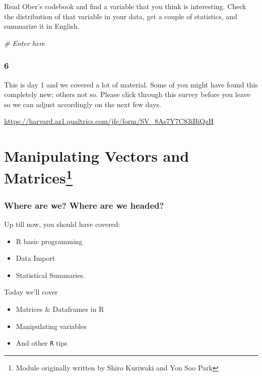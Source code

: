 \documentclass[]{book}
\newenvironment{Shaded}{\begin{snugshade}}{\end{snugshade}}
\newcommand{\CommentTok}[1]{\textcolor[rgb]{0.56,0.35,0.01}{\textit{#1}}}
\providecommand{\tightlist}{%
  \setlength{\itemsep}{0pt}\setlength{\parskip}{0pt}}
\let\rmarkdownfootnote\footnote%
\def\footnote{\protect\rmarkdownfootnote}
\theoremstyle{definition}
\theoremstyle{definition}
\theoremstyle{definition}
\theoremstyle{remark}
\begin{document}
Read Ober's codebook and find a variable that you think is interesting. Check the distribution of that variable in your data, get a couple of statistics, and summarize it in English.

\begin{Shaded}
\begin{Highlighting}[]
\CommentTok{# Enter here}
\end{Highlighting}
\end{Shaded}

\hypertarget{section-5}{%
\subsection*{6}\label{section-5}}

This is day 1 and we covered a lot of material. Some of you might have found this completely new; others not so. Please click through this survey before you leave so we can adjust accordingly on the next few days.

\url{https://harvard.az1.qualtrics.com/jfe/form/SV_8As7Y7C83iBiQzH}

\hypertarget{rmatrices}{%
\chapter[Manipulating Vectors and Matrices]{\texorpdfstring{Manipulating Vectors and Matrices\footnote{Module originally written by Shiro Kuriwaki and Yon Soo Park}}{Manipulating Vectors and Matrices}}\label{rmatrices}}

\hypertarget{where-are-we-where-are-we-headed-1}{%
\subsection*{Where are we? Where are we headed?}\label{where-are-we-where-are-we-headed-1}}

Up till now, you should have covered:

\begin{itemize}
\tightlist
\item
  R basic programming
\item
  Data Import
\item
  Statistical Summaries.
\end{itemize}

Today we'll cover

\begin{itemize}
\tightlist
\item
  Matrices \& Dataframes in R
\item
  Manipulating variables
\item
  And other \texttt{R} tips
\end{itemize}
\end{document}
